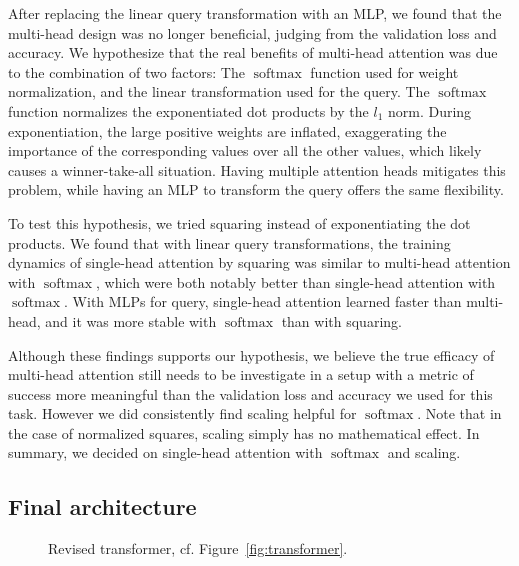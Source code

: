 \documentclass[11pt,twocolumn]{article}
\DeclareMathOperator{\softmax}{softmax}
\begin{document}
After replacing the linear query transformation with an MLP,
we found that the multi-head design was no longer beneficial,
judging from the validation loss and accuracy.
We hypothesize that the real benefits of multi-head attention was due to the combination of two factors:
The \(\softmax\) function used for weight normalization,
and the linear transformation used for the query.
The \(\softmax\) function normalizes the exponentiated dot products by the \(l_{1}\) norm.
During exponentiation, the large positive weights are inflated,
exaggerating the importance of the corresponding values over all the other values,
which likely causes a winner-take-all situation.
Having multiple attention heads mitigates this problem,
while having an MLP to transform the query offers the same flexibility.

To test this hypothesis, we tried squaring instead of exponentiating the dot products.
We found that with linear query transformations,
the training dynamics of single-head attention by squaring was similar to
multi-head attention with \(\softmax\), which were both notably better than single-head attention with \(\softmax\).
With MLPs for query, single-head attention learned faster than multi-head,
and it was more stable with \(\softmax\) than with squaring.

Although these findings supports our hypothesis,
we believe the true efficacy of multi-head attention still needs to be investigate in a setup
with a metric of success more meaningful than the validation loss and accuracy we used for this task.
However we did consistently find scaling helpful for \(\softmax\).
Note that in the case of normalized squares, scaling simply has no mathematical effect.
In summary, we decided on single-head attention with \(\softmax\) and scaling.

\subsection{Final architecture}

\begin{figure}
  \centering
  \caption[]{\label{fig:arch}Revised transformer, cf. Figure~\ref{fig:transformer}.}
\end{figure}
\end{document}
